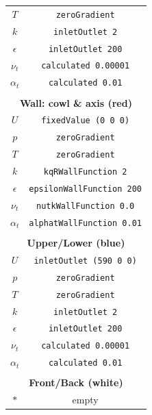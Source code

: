 \begin{table}[h!]
\begin{tabular}{cc}
        $T$                     &  \texttt{zeroGradient}          \\
        $k$                    & \texttt{inletOutlet 2}           \\
        $\epsilon$                    & \texttt{inletOutlet 200}           \\
        $\nu_t$                    & \texttt{calculated 0.00001}           \\
        $\alpha_t$                    & \texttt{calculated 0.01}           \\
        & \\
        \multicolumn{2}{c}{\textbf{Wall: cowl \& axis (red)}}           \\
        \hline
        $U$                    & \texttt{fixedValue (0 0 0)}           \\
        $p$                     &  \texttt{zeroGradient}          \\
        $T$                     &  \texttt{zeroGradient}          \\
        $k$                    & \texttt{kqRWallFunction 2}           \\
        $\epsilon$                    & \texttt{epsilonWallFunction 200}           \\
        $\nu_t$                    & \texttt{nutkWallFunction 0.0}           \\
        $\alpha_t$                    & \texttt{alphatWallFunction 0.01}           \\
        & \\

        \multicolumn{2}{c}{\textbf{Upper/Lower (blue)}}      \\
        \hline
        $U$                    & \texttt{inletOutlet (590 0 0)}           \\
        $p$                     &  \texttt{zeroGradient}          \\
        $T$                     &  \texttt{zeroGradient}          \\
        $k$                    & \texttt{inletOutlet 2}           \\
        $\epsilon$                    & \texttt{inletOutlet 200}           \\
        $\nu_t$                    & \texttt{calculated 0.00001}           \\
        $\alpha_t$                    & \texttt{calculated 0.01}           \\
                & \\

        \multicolumn{2}{c}{\textbf{Front/Back (white)}}      \\
        \hline
        $\texttt{*}$                    & empty \\
        \end{tabular}
        \end{table}

